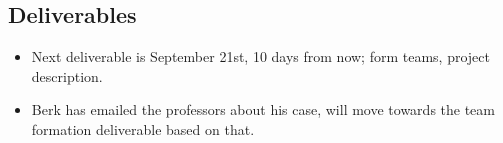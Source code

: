 		\subsection*{Deliverables}
			\begin{itemize}
				\item Next deliverable is September 21st, 10 days from now; form teams, project description. 
				\item Berk has emailed the professors about his case, will move towards the team formation deliverable based on that. 
			\end{itemize}	
